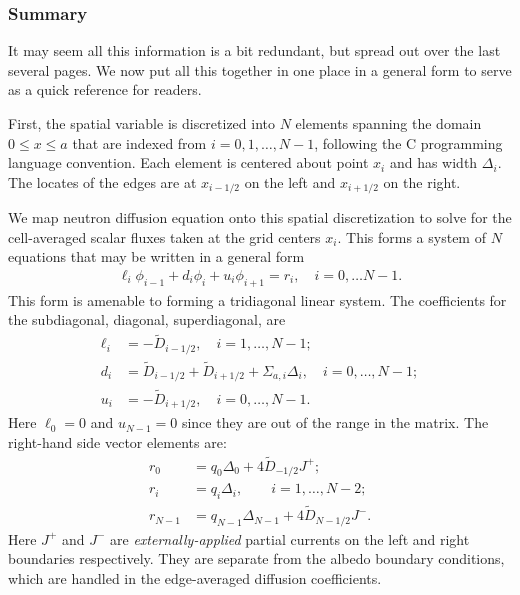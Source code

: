 \subsubsection{Summary}

It may seem all this information is a bit redundant, but spread out over the last several pages. We now put all this together in one place in a general form to serve as a quick reference for readers. 

First, the spatial variable is discretized into $N$ elements spanning the domain $0 \le x \le a$ that are indexed from $i = 0, 1, \ldots, N-1$, following the C programming language convention. Each element is centered about point $x_i$ and has width $\Delta_i$. The locates of the edges are at $x_{i-1/2}$ on the left and $x_{i+1/2}$ on the right.  

We map neutron diffusion equation onto this spatial discretization to solve for the cell-averaged scalar fluxes taken at the grid centers $x_i$. This forms a system of $N$ equations that may be written in a general form
\begin{align}
  \ell_i \phi_{i-1} + d_i \phi_i + u_i \phi_{i+1} = r_i , \quad i = 0, \ldots N-1.
\end{align}
This form is amenable to forming a tridiagonal linear system. The coefficients for the subdiagonal, diagonal, superdiagonal, are
\begin{subequations}
\begin{align}
  \ell_i	&= -\widetilde{D}_{i-1/2}, \quad i = 1, \ldots, N-1; \\
  d_i		&=  \widetilde{D}_{i-1/2} + \widetilde{D}_{i+1/2}  + \Sigma_{a,i} \Delta_i, \quad i = 0, \ldots, N-1; \\
  u_i		&= -\widetilde{D}_{i+1/2}, \quad i = 0, \ldots, N-1.
\end{align} 
\end{subequations}
Here $\ell_0 = 0$ and $u_{N-1} = 0$ since they are out of the range in the matrix. The right-hand side vector elements are:
\begin{subequations}
\begin{align}
  r_0		&= q_0 \Delta_0 + 4 \widetilde{D}_{-1/2} J^+ ; \\
  r_i		&= q_i \Delta_i , \qquad i = 1, \ldots, N-2; \\
  r_{N-1}	&= q_{N-1} \Delta_{N-1} + 4 \widetilde{D}_{N-1/2} J^-.
\end{align} 
\end{subequations}
Here $J^+$ and $J^-$ are \emph{externally-applied} partial currents on the left and right boundaries respectively. They are separate from the albedo boundary conditions, which are handled in the edge-averaged diffusion coefficients.

